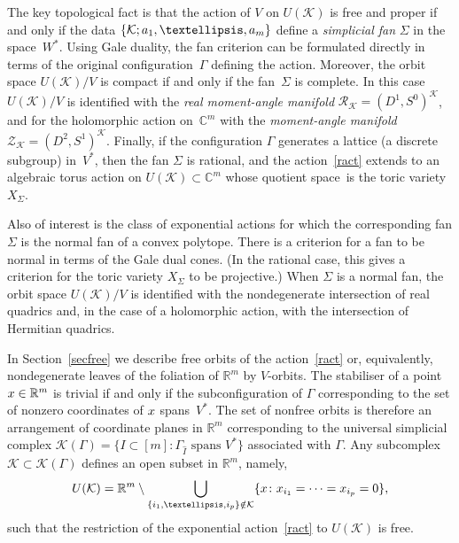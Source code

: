 \documentclass[a4paper]{amsart}
\theoremstyle{definition}
\theoremstyle{remark}
\numberwithin{equation}{section}
\def\R{\mathbb R}
\def\R{\mathbb R}
\newcommand{\mb}[1]{{\textbf {\textit#1}}}
\newcommand{\<}{\langle}
\renewcommand{\>}{\rangle}
\begin{document}
The key topological fact is that the action of $V$ on $U(\mathcal K)$ is free and proper if and only if the data $\{\mathcal K;\mb a_1,\ldots,\mb a_m\}$ define a \emph{simplicial fan} $\Sigma$ in the space~$W^*$. Using Gale duality, the fan criterion can be formulated directly in terms of the original configuration~$\Gamma$ defining the action. Moreover, the orbit space $U(\mathcal K)/V$ is compact if and only if the fan~$\Sigma$ is complete. In this case $U(\mathcal K)/V$ is identified with the \emph{real moment-angle manifold} $\mathcal R_{\mathcal K}=(D^1,S^0)^{\mathcal K}$, and for the holomorphic action on~$\mathbb C^m$ with the \emph{moment-angle manifold} $\mathcal Z_{\mathcal K}=(D^2,S^1)^{\mathcal K}$. Finally, if the configuration $\Gamma$ generates a lattice (a discrete subgroup) in~$V^*$, then the fan $\Sigma$ is rational, and the action~\eqref{ract} extends to an algebraic torus action on $U(\mathcal K)\subset\mathbb C^m$ whose quotient space~is the toric variety~$X_\Sigma$. 

Also of interest is the class of exponential actions for which the corresponding fan $\Sigma$ is the normal fan of a convex polytope. There is a criterion for a fan to be normal in terms of the Gale dual cones. (In the rational case, this gives a criterion for the toric variety $X_\Sigma$ to be projective.) When $\Sigma$ is a normal fan, the orbit space $U(\mathcal K)/V$ is identified with the nondegenerate intersection of real quadrics and, in the case of a holomorphic action, with the intersection of Hermitian quadrics.

\medskip

In Section~\ref{secfree} we describe free orbits of the action~\eqref{ract} or, equivalently, nondegenerate leaves of the foliation of $\R^m$ by $V$-orbits. The stabiliser of a point $\mb x\in\R^m$ is trivial if and only if the subconfiguration of $\Gamma$ corresponding to the set of nonzero coordinates of $\mb x$ spans~$V^*$. The set of nonfree orbits is therefore an arrangement of coordinate planes in $\R^m$ corresponding to the universal simplicial complex $\mathcal K(\Gamma)=\{I\subset[m]\colon \Gamma_{\widehat I}\text{ spans }V^*\}$
associated with $\Gamma$. Any subcomplex $\mathcal K\subset\mathcal K(\Gamma)$ defines an open subset in $\R^m$, namely,
\[
  U(\mathcal K)=\R^m\setminus\bigcup_{\{i_1,\ldots,i_p\}\notin\mathcal K}
  \{\mb x\colon x_{i_1}=\cdots=x_{i_p}=0\},
\]  
such that the restriction of the exponential action~\eqref{ract} to $U(\mathcal K)$ is free.
\end{document}
